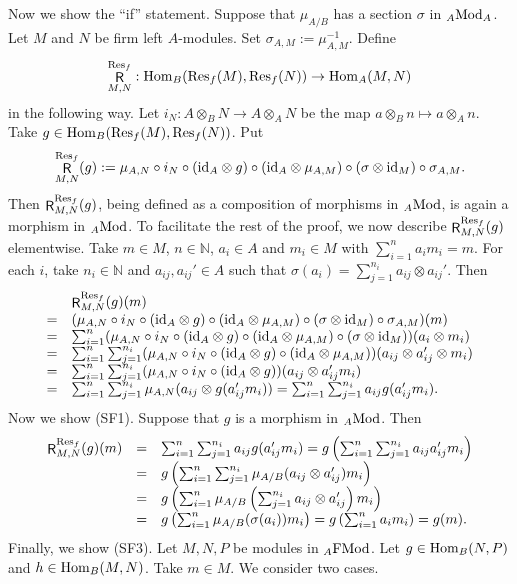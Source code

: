 \documentclass[12pt]{amsart}
\theoremstyle{definition}
\newcommand{\N}{\mathbb{N}}
\newcommand{\Mod}{{\rm Mod}}
\newcommand{\FMod}{{\rm FMod}}
\newcommand{\id}{{\rm id}}
\newcommand{\Hom}{{\rm Hom}}
\newcommand{\Res}{{\rm Res}}
\DeclareMathOperator{\R}{\mathsf R}
\begin{document}
Now we show the ``if'' statement.
Suppose that $\mu_{A/B}$ has a
section $\sigma$ in ${}_A \Mod_A$.
Let $M$ and $N$ be firm left $A$-modules.
Set $\sigma_{A,M} := \mu_{A,M}^{-1}$.
Define 
\[
\R_{M,N}^{\Res_f} : 
\Hom_B(\Res_f(M),\Res_f(N)) \to 
\Hom_A(M,N)
\]
in the following way. 
Let $i_N : A \otimes_B N \to A \otimes_A N$ be the 
map $a \otimes_B n \mapsto a \otimes_A n$.
Take $g \in \Hom_B( \Res_f(M) , \Res_f(N) )$. Put
\[
\R^{\Res_f}_{M,N}(g) :=
\mu_{A,N} \circ i_N \circ (\id_A \otimes g) \circ 
(\id_A \otimes \mu_{A,M}) \circ 
(\sigma \otimes \id_M) \circ \sigma_{A,M}.
\]
Then $\R_{M,N}^{\Res_f}(g)$, being 
defined as a 
composition of morphisms in ${}_A \Mod$, 
is again a morphism in ${}_A \Mod$.
To facilitate the rest of the proof, we now
describe $\R_{M,N}^{\Res_f}(g)$ elementwise. 
Take $m \in M$, $n \in \N$, $a_i \in A$ and $m_i \in M$
with $\sum_{i=1}^n a_i m_i = m$. For each $i$,
take $n_i \in \N$ and $a_{ij},a_{ij}' \in A$
such that 
$\sigma(a_i) = \sum_{j=1}^{n_i} 
a_{ij} \otimes a_{ij}'$. Then
\[
\begin{array}{cl}
  & \R_{M,N}^{\Res_f}(g)(m) \\
= & (\mu_{A,N} \circ i_N \circ (\id_A \otimes g) 
\circ (\id_A \otimes \mu_{A,M}) \circ 
(\sigma \otimes \id_M) \circ 
\sigma_{A,M})(m) \\
= & 
\sum_{i=1}^n (\mu_{A,N} \circ i_N \circ 
(\id_A \otimes g) \circ 
(\id_A \otimes \mu_{A,M}) \circ 
(\sigma \otimes \id_M))
( a_i \otimes m_i ) \\
= & 
\sum_{i=1}^n \sum_{j=1}^{n_i}
(\mu_{A,N} \circ i_N \circ (\id_A \otimes g) 
\circ (\id_A \otimes \mu_{A,M})) 
( a_{ij} \otimes a_{ij}' \otimes m_i ) \\
= & 
\sum_{i=1}^n \sum_{j=1}^{n_i}
(\mu_{A,N} \circ i_N \circ (\id_A \otimes g))
( a_{ij} \otimes a_{ij}' m_i ) \\
= & \sum_{i=1}^n \sum_{j=1}^{n_i}
\mu_{A,N} ( a_{ij} \otimes g(a_{ij}' m_i) ) 
= \sum_{i=1}^n \sum_{j=1}^{n_i}
a_{ij} g(a_{ij}' m_i).
\end{array}
\]
Now we show (SF1). Suppose that $g$ is a morphism
in ${}_A \Mod$. Then
\[
\begin{array}{rcl}
 \R_{M,N}^{\Res_f}(g)(m) 
 &=& 
 \sum_{i=1}^n \sum_{j=1}^{n_i}
a_{ij} g(a_{ij}' m_i)  
= 
g \left( \sum_{i=1}^n \sum_{j=1}^{n_i}
a_{ij} a_{ij}' m_i \right) \\
&=& g \left( \sum_{i=1}^n \sum_{j=1}^{n_i}
\mu_{A/B}(a_{ij} \otimes a_{ij}') m_i \right) \\
&=&  g \left( \sum_{i=1}^n 
\mu_{A/B} \left( \sum_{j=1}^{n_i} a_{ij} \otimes a_{ij}' \right)
m_i \right) \\
&=&  g \left( \sum_{i=1}^n 
\mu_{A/B}( \sigma(a_i) ) m_i \right) 
= g \left( \sum_{i=1}^n a_i m_i \right) 
= g(m).
\end{array}
\]
Finally, we show (SF3). 
Let $M,N,P$ be modules in ${}_A \FMod$. 
Let  $g \in \Hom_B(N,P)$ and 
$h \in \Hom_B(M,N)$. Take $m \in M$.
We consider two cases.
\end{document}
